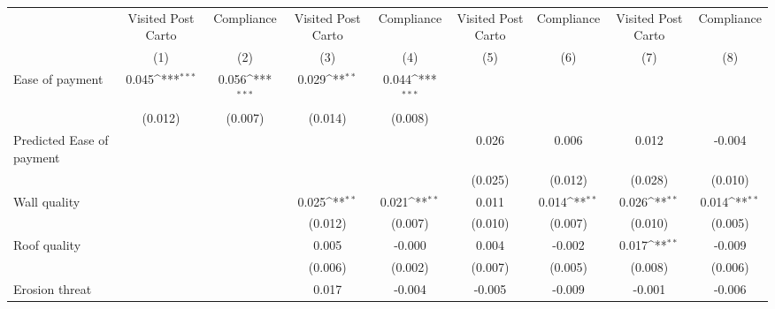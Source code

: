 {
\def\sym#1{\ifmmode^{#1}\else\(^{#1}\)\fi}
\begin{tabular}{l*{8}{c}}
\toprule
                &\multicolumn{1}{c}{Visited Post Carto}&\multicolumn{1}{c}{Compliance}&\multicolumn{1}{c}{Visited Post Carto}&\multicolumn{1}{c}{Compliance}&\multicolumn{1}{c}{Visited Post Carto}&\multicolumn{1}{c}{Compliance}&\multicolumn{1}{c}{Visited Post Carto}&\multicolumn{1}{c}{Compliance}\\
                &\multicolumn{1}{c}{(1)}         &\multicolumn{1}{c}{(2)}         &\multicolumn{1}{c}{(3)}         &\multicolumn{1}{c}{(4)}         &\multicolumn{1}{c}{(5)}         &\multicolumn{1}{c}{(6)}         &\multicolumn{1}{c}{(7)}         &\multicolumn{1}{c}{(8)}         \\
\midrule
Ease of payment &    0.045\sym{***}&    0.056\sym{***}&    0.029\sym{**} &    0.044\sym{***}&                  &                  &                  &                  \\
                &  (0.012)         &  (0.007)         &  (0.014)         &  (0.008)         &                  &                  &                  &                  \\
Predicted Ease of payment&                  &                  &                  &                  &    0.026         &    0.006         &    0.012         &   -0.004         \\
                &                  &                  &                  &                  &  (0.025)         &  (0.012)         &  (0.028)         &  (0.010)         \\
Wall quality    &                  &                  &    0.025\sym{**} &    0.021\sym{**} &    0.011         &    0.014\sym{**} &    0.026\sym{**} &    0.014\sym{**} \\
                &                  &                  &  (0.012)         &  (0.007)         &  (0.010)         &  (0.007)         &  (0.010)         &  (0.005)         \\
Roof quality    &                  &                  &    0.005         &   -0.000         &    0.004         &   -0.002         &    0.017\sym{**} &   -0.009         \\
                &                  &                  &  (0.006)         &  (0.002)         &  (0.007)         &  (0.005)         &  (0.008)         &  (0.006)         \\
Erosion threat  &                  &                  &    0.017         &   -0.004         &   -0.005         &   -0.009         &   -0.001         &   -0.006         \\

\end{tabular}}
